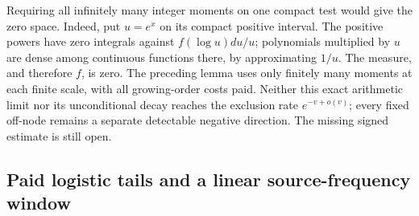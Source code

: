 \documentclass[11pt]{article}
\theoremstyle{remark}\newtheorem{remark}[theorem]{Remark}
\begin{document}
Requiring all infinitely many integer moments on one compact
test would give the zero space. Indeed, put \(u=e^x\) on its
compact positive interval. The positive powers have zero integrals
against \(f(\log u)du/u\); polynomials multiplied by \(u\) are
dense among continuous functions there, by approximating \(1/u\).
The measure, and therefore \(f\), is zero. The preceding lemma
uses only finitely many moments at each finite scale, with all
growing-order costs paid. Neither this exact arithmetic limit nor
its unconditional decay reaches the exclusion rate
\(e^{-v+o(v)}\); every fixed off-node remains a separate detectable
negative direction. The missing signed estimate is still open.

\subsection{Paid logistic tails and a linear source-frequency window}
\label{sec:logistic-source-window}
\end{document}

